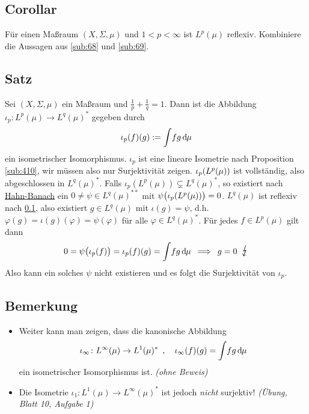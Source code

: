 \subsection[Corollar: $L^p(\mu)$ ist für $1<p<\infty$ reflexiv.]{Corollar} %
\label{sub:610}
Für einen Maßraum $(X,\Sigma, \mu)$ und $1 < p< \infty$ ist $L^p(\mu)$ reflexiv.
Kombiniere die Aussagen aus \ref{sub:68} und \ref{sub:69}. \bewende

\subsection[Satz: Isometrischer Isomorphismus $\iota_p \colon L^p(\mu) \to L^q(\mu)^*$]{Satz} %
\label{sub:611}
Sei $(X,\Sigma,\mu)$ ein Maßraum und $\frac{1}{p} + \frac{1}{q}=1$. Dann ist die Abbildung $\iota_p \colon L^p(\mu) \to L^q(\mu)^*$ gegeben durch 
\[
	\iota_p(f)(g) := \int \!f g \,\mathd\mu
\] 
ein isometrischer Isomorphismus.
$\iota_p$ ist eine lineare Isometrie nach Proposition \ref{sub:410}, wir müssen also nur Surjektivität zeigen. $\iota_p \enbrace*{L^p(\mu)}$ ist vollständig, also 
abgeschlossen in $L^q(\mu)^*$. Falls $\iota_p(L^p(\mu)) \subsetneq L^q(\mu)^*$, so existiert nach \hyperref[sub:227]{Hahn-Banach} ein $0 \not= \psi \in L^q(\mu)^{**}$ mit
$\psi \enbrace[\big]{\iota_p(L^p(\mu))} =0$. $L^q(\mu)$ ist reflexiv nach \ref{sub:610}, also existiert $g \in L^q(\mu)$ mit $\iota(g)=\psi$, d.h. 
$\varphi(g)= \iota(g)(\varphi)=\psi(\varphi)$ für alle $\varphi \in L^q(\mu)^*$. Für jedes $f\in L^p(\mu)$ gilt dann
\[
	0 = \psi \enbrace[\big]{\iota_p(f)} = \iota_p(f)(g) = \int\! f g \, \mathd\mu \enspace \Longrightarrow \enspace g=0 \enspace\light
\]
Also kann ein solches $\psi$ nicht existieren und es folgt die Surjektivität von $\iota_p$. \bewende

\subsection[Bemerkung zur Gültigkeit von Satz \ref{sub:611} für $p\in \set{1,\infty}$]{Bemerkung} %
\label{sub:612}
\begin{itemize}
	\item Weiter kann man zeigen, dass die kanonische Abbildung 
	\[
		\iota_\infty \colon L^\infty(\mu) \to L^1(\mu)^* \enspace,  \quad \iota_\infty(f)(g) = \int\! fg \, \mathd\mu
	\]
	ein isometrischer Isomorphismus ist. \hfill \emph{(ohne Beweis)}
	\item Die Isometrie $\iota_1 \colon L^1(\mu) \to L^\infty(\mu)^*$ ist jedoch \emph{nicht} surjektiv! \hfill \emph{(Übung, Blatt 10, Aufgabe 1)}
\end{itemize}

